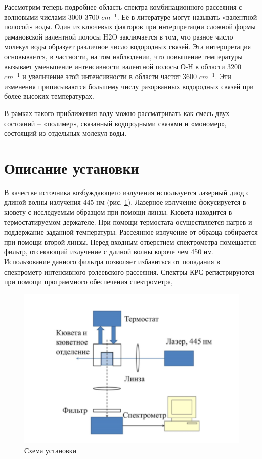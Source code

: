 \documentclass{article}
\begin{document}
Рассмотрим теперь подробнее область спектра комбинационного рассеяния с волновыми
числами 3000-3700 $cm^{-1}$. Её в литературе могут называть «валентной полосой» воды. Один из
ключевых факторов при интерпретации сложной формы рамановской валентной полосы H2O
заключается в том, что разное число молекул воды образует различное число водородных связей. Эта интерпретация основывается, в частности, на том наблюдении, что повышение
температуры вызывает уменьшение интенсивности валентной полосы О-Н в области 3200 $cm^{-1}$
и увеличение этой интенсивности в области частот 3600 $cm^{-1}$. Эти изменения приписываются
большему числу разорванных водородных связей при более высоких температурах.

В рамках такого приближения воду можно рассматривать как смесь двух состояний – «полимер», связанный водородными связями и «мономер», состоящий из отдельных молекул воды.

\section{Описание установки}\;
\par В качестве источника возбуждающего излучения используется лазерный диод с длиной волны излучения 445 нм (рис. \ref{fig: схема}). Лазерное излучение фокусируется в кювету с исследуемым образцом при помощи линзы. Кювета находится в термостатируемом держателе. При помощи термостата
осуществляется нагрев и поддержание заданной температуры. Рассеянное излучение от образца собирается при помощи второй линзы. Перед входным отверстием спектрометра помещается фильтр, отсекающий излучение с длиной волны короче чем 450 нм. Использование данного фильтра позволяет избавиться от попадания в спектрометр интенсивного рэлеевского рассеяния. Спектры КРС регистрируются при помощи программного обеспечения спектрометра,
\begin{figure}[h!]
\centering
    \includegraphics[width=0.8\linewidth]{Images/схема.png}
    \caption{Схема установки}
    \label{fig: схема}
\end{figure}
\end{document}
